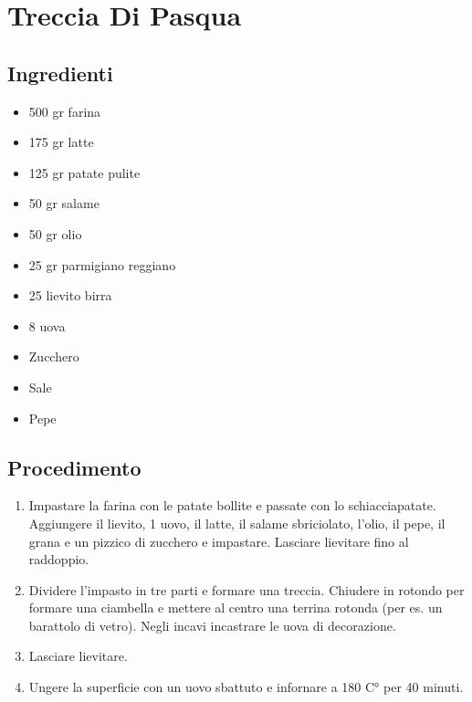 \section{Treccia Di Pasqua}
\subsection{Ingredienti}
\begin{itemize}
\item 500 gr farina  
\item 175 gr latte  
\item 125 gr patate pulite  
\item 50 gr salame  
\item 50 gr olio  
\item 25 gr parmigiano reggiano  
\item 25 lievito birra  
\item 8 uova  
\item Zucchero  
\item Sale  
\item Pepe
\end{itemize}
\subsection{Procedimento}
\begin{enumerate}
\item  Impastare la farina con le patate bollite e passate con lo schiacciapatate. Aggiungere il lievito, 1 uovo, il latte, il salame sbriciolato, l'olio, il pepe, il grana e un pizzico di zucchero e impastare. Lasciare lievitare fino al raddoppio.  
\item  Dividere l'impasto in tre parti e formare una treccia. Chiudere in rotondo per formare una ciambella e mettere al centro una terrina rotonda (per es. un barattolo di vetro). Negli incavi incastrare le uova di decorazione.  
\item  Lasciare lievitare.  
\item  Ungere la superficie con un uovo sbattuto e infornare a 180 C° per 40 minuti.
\end{enumerate}
